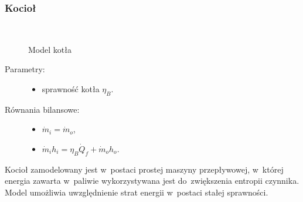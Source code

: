 \subsubsection{Kocioł}

\begin{figure}[H]
	\centering

	~ %

	\caption{Model kotła}
	\label{elem:kociol}
\end{figure}

\begin{description}

	\item[Parametry:] \hfill

		\begin{itemize}

			\item sprawność kotła $\eta_B$.

		\end{itemize}

	\item[Równania bilansowe:] \hfill

		\begin{itemize}

			\item \eq$\dot m_i = \dot m_o$,

			\item \eq$\dot m_i h_i = \eta_B \dot Q_f + \dot m_o h_o$.

		\end{itemize}

\end{description}

Kocioł zamodelowany jest w~postaci prostej maszyny przepływowej,
w~której energia zawarta w~paliwie wykorzystywana jest do~zwiększenia
entropii czynnika. Model umożliwia uwzględnienie strat energii w~postaci
stałej sprawności.
